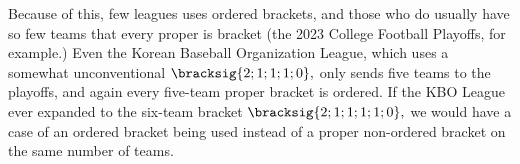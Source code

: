 {

Because of this, few leagues uses ordered brackets, and those who do usually have so few teams that every proper is bracket (the 2023 College Football Playoffs, for example.) Even the Korean Baseball Organization League, which uses a somewhat unconventional $\bracksig{2; 1; 1; 1; 0},$ only sends five teams to the playoffs, and again every five-team proper bracket is ordered. If the KBO League ever expanded to the six-team bracket $\bracksig{2; 1; 1; 1; 1; 0},$ we would have a case of an ordered bracket being used instead of a proper non-ordered bracket on the same number of teams.
}